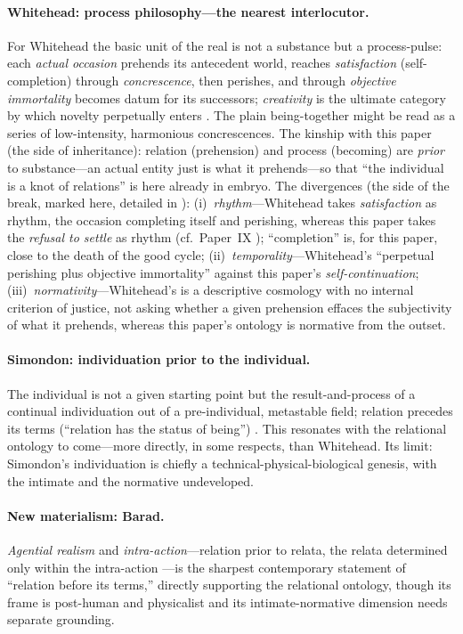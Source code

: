\paragraph{Whitehead: process philosophy---the nearest interlocutor.} For Whitehead the basic unit of the real is not a substance but a process-pulse: each \emph{actual occasion} prehends its antecedent world, reaches \emph{satisfaction} (self-completion) through \emph{concrescence}, then perishes, and through \emph{objective immortality} becomes datum for its successors; \emph{creativity} is the ultimate category by which novelty perpetually enters \parencite{whitehead1978}. The plain being-together might be read as a series of low-intensity, harmonious concrescences. The kinship with this paper (the side of inheritance): relation (prehension) and process (becoming) are \emph{prior} to substance---an actual entity just is what it prehends---so that ``the individual is a knot of relations'' is here already in embryo. The divergences (the side of the break, marked here, detailed in ): (i)~\emph{rhythm}---Whitehead takes \emph{satisfaction} as rhythm, the occasion completing itself and perishing, whereas this paper takes the \emph{refusal to settle} as rhythm (cf.\ Paper~IX \parencite{paperix}); ``completion'' is, for this paper, close to the death of the good cycle; (ii)~\emph{temporality}---Whitehead's ``perpetual perishing plus objective immortality'' against this paper's \emph{self-continuation}; (iii)~\emph{normativity}---Whitehead's is a descriptive cosmology with no internal criterion of justice, not asking whether a given prehension effaces the subjectivity of what it prehends, whereas this paper's ontology is normative from the outset.

\paragraph{Simondon: individuation prior to the individual.} The individual is not a given starting point but the result-and-process of a continual individuation out of a pre-individual, metastable field; relation precedes its terms (``relation has the status of being'') \parencite{simondon2020}. This resonates with the relational ontology to come---more directly, in some respects, than Whitehead. Its limit: Simondon's individuation is chiefly a technical-physical-biological genesis, with the intimate and the normative undeveloped.

\paragraph{New materialism: Barad.} \emph{Agential realism} and \emph{intra-action}---relation prior to relata, the relata determined only within the intra-action \parencite{barad2007}---is the sharpest contemporary statement of ``relation before its terms,'' directly supporting the relational ontology, though its frame is post-human and physicalist and its intimate-normative dimension needs separate grounding.

